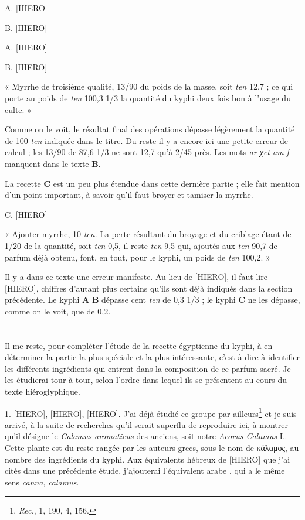 \documentclass[a4paper, 11pt, oneside]{article}
\newcommand*\arabicAAAC{}
\begin{document}
A. [HIERO]

B. [HIERO]

A. [HIERO]

B. [HIERO]

« Myrrhe de troisième qualité, 13/90 du poids de la masse, soit \emph{ten} 12,7 ; ce qui porte au poids de \emph{ten} 100,3 1/3 la quantité du kyphi deux fois bon à l'usage du culte. »

Comme on le voit, le résultat final des opérations dépasse légèrement la quantité de 100 \emph{ten} indiquée dans le titre. Du reste il y a encore ici une petite erreur de calcul ; les 13/90 de 87,6 1/3 ne sont 12,7 qu'à 2/45 près. Les mots \emph{ar χet am-f} manquent dans le texte \textbf{B}.

La recette \textbf{C} est un peu plus étendue dans cette dernière partie ; elle fait mention d'un point important, à savoir qu'il faut broyer et tamiser la myrrhe.

C. [HIERO]

« Ajouter myrrhe, 10 \emph{ten}. La perte résultant du broyage et du criblage étant de 1/20 de la quantité, soit \emph{ten} 0,5, il reste \emph{ten} 9,5 qui, ajoutés aux \emph{ten} 90,7 de parfum déjà obtenu, font, en tout, pour le kyphi, un poids de \emph{ten} 100,2. »

Il y a dans ce texte une erreur manifeste. Au lieu de [HIERO], il faut lire [HIERO], chiffres d'autant plus certains qu'ils sont déjà indiqués dans la section précédente. Le kyphi \textbf{A} \textbf{B} dépasse cent \emph{ten} de 0,3 1/3 ; le kyphi \textbf{C} ne les dépasse, comme on le voit, que de 0,2.
\clearpage
\section{}
\paragraph{}
Il me reste, pour compléter l'étude de la recette égyptienne du kyphi, à en déterminer la partie la plus spéciale et la plus intéressante, c'est-à-dire à identifier les différents ingrédients qui entrent dans la composition de ce parfum sacré. Je les étudierai tour à tour, selon l'ordre dans lequel ils se présentent au cours du texte hiéroglyphique.

1. [HIERO], [HIERO], [HIERO]. J'ai déjà étudié ce groupe par ailleurs\footnote{\emph{Rec.}, 1, 190, 4, 156.} et je suis arrivé, à la suite de recherches qu'il serait superflu de reproduire ici, à montrer qu'il désigne le \emph{Calamus aromaticus} des anciens, soit notre \emph{Acorus Calamus} L. Cette plante est du reste rangée par les auteurs grecs, sous le nom de κάλαμος, au nombre des ingrédients du kyphi. Aux équivalents hébreux de [HIERO] que j'ai cités dans une précédente étude, j'ajouterai l'équivalent arabe $\arabicAAAC$, qui a le même sens \emph{canna}, \emph{calamus}.
\end{document}
